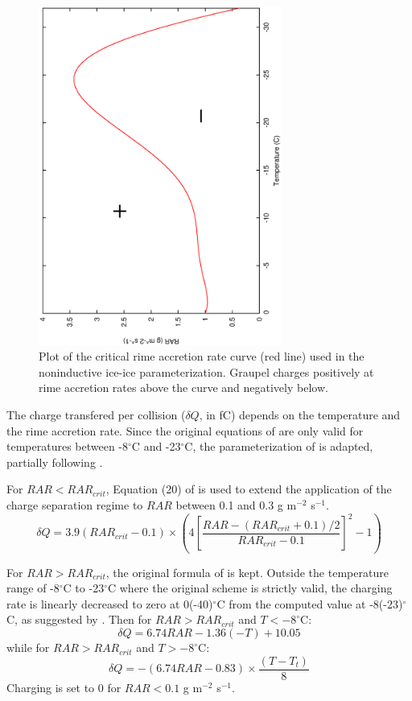 \begin{figure}[h]
  \begin{center}
     \includegraphics[angle=270,width=8cm]{./EPS/saunders_peck.ps}
  \end{center}
  \caption{Plot of the critical rime accretion rate curve (red line) used in the \citet{Saunders-1998} noninductive ice-ice parameterization. Graupel charges positively at rime accretion rates above the curve and negatively below.}
  \label{fig:saunders_peck}
\end{figure}

The charge transfered per collision ($\delta Q$, in fC) depends on the temperature and the rime accretion rate.
Since the original equations of \citet{Saunders-1998} are only valid for temperatures between -8$^{\circ}$C and -23$^{\circ}$C, the parameterization of \citet{Saunders-1998} is adapted, partially following \citet{Mansell-2005}.

For $RAR < RAR_{crit}$, Equation (20) of \citet{Mansell-2005} is used to extend the application of the charge separation regime to $RAR$ between 0.1 and 0.3 g m$^{-2}$ s$^{-1}$. 
\begin{equation}
  \delta Q = 3.9 (RAR_{crit} - 0.1) \times \left( 4 \left[ \frac{RAR - (RAR_{crit} + 0.1)/2}{RAR_{crit} - 0.1}\right]^2 -1 \right)
\end{equation}

For $RAR > RAR_{crit}$, the original formula of \citet{Saunders-1998} is kept.
Outside the temperature range of -8$^{\circ}$C to -23$^{\circ}$C where the original \citet{Saunders-1998} scheme is strictly valid, the charging rate is linearly decreased to zero at 0(-40)$^{\circ}$C from the computed value at -8(-23)$^{\circ}$C, as suggested by \citet{Mansell-2005}.
Then for $RAR > RAR_{crit}$ and $T < -8^{\circ}$C:
\begin{equation}
  \delta Q = 6.74 RAR - 1.36 (-T) + 10.05
\end{equation}
while for $RAR > RAR_{crit}$ and $T > -8^{\circ}$C:
\begin{equation}
  \delta Q = -(6.74 RAR - 0.83) \times \frac{(T-T_t)}{8}
\end{equation}
Charging is set to 0 for $RAR < 0.1$ g m$^{-2}$ s$^{-1}$.

